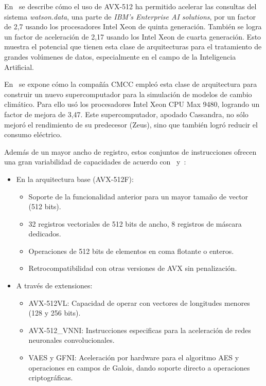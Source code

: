 En~\cite{avx-ibm} se describe cómo el uso de AVX-512 ha permitido acelerar las
consultas del sistema \textit{watson.data}, una parte de \textit{IBM's Enterprise AI
solutions}, por un factor de 2,7 usando los procesadores Intel Xeon de quinta
generación. También se logra un factor de aceleración de 2,17 usando los Intel
Xeon de cuarta generación. Esto muestra el potencial que tienen esta clase de
arquitecturas para el tratamiento de grandes volúmenes de datos, especialmente
en el campo de la Inteligencia Artificial.

En~\cite{avx-cmcc} se expone cómo la compañía CMCC empleó esta clase de
arquitectura para construir un nuevo supercomputador para la simulación de
modelos de cambio climático. Para ello usó los procesadores Intel Xeon CPU Max
9480, logrando un factor de mejora de 3,47. Este supercomputador, apodado
Cassandra, no sólo mejoró el rendimiento de su predecesor (Zeus), sino que
también logró reducir el consumo eléctrico.

Además de un mayor ancho de registro, estos conjuntos de instrucciones ofrecen
una gran variabilidad de capacidades de acuerdo con~\cite{vector_research} y~\cite{intel-avx512-2}:

\begin{itemize}
    \item En la arquitectura base (AVX-512F): 
    \begin{itemize}
        \item Soporte de la funcionalidad anterior para un mayor tamaño de vector (512 bits).
        \item 32 registros vectoriales de 512 bits de ancho, 8 registros de máscara dedicados.
        \item Operaciones de 512 bits de elementos en coma flotante o enteros.
        \item Retrocompatibilidad con otras versiones de AVX sin penalización.
    \end{itemize}
    \item A través de extensiones:
    \begin{itemize}
        \item AVX-512VL\@: Capacidad de operar con vectores de longitudes menores (128 y 256 bits).
        \item AVX-512\_VNNI\@: Instrucciones especificas para la aceleración de redes neuronales convolucionales.
        \item VAES y GFNI\@: Aceleración por hardware para el algoritmo AES y operaciones en campos de Galois, dando soporte directo a operaciones criptográficas.
    \end{itemize}
\end{itemize}

